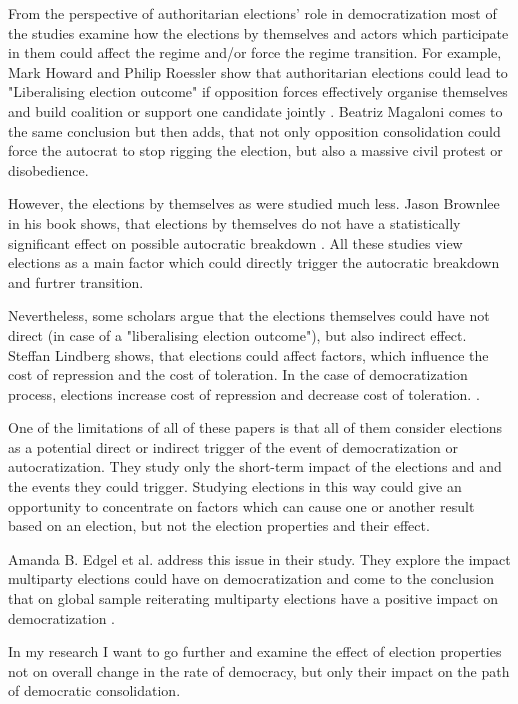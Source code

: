 \documentclass[a4paper, 12pt]{article}
\begin{document}
From the perspective of authoritarian elections' role in democratization most of the studies examine how the elections by themselves and actors which participate in them could affect the regime and/or force the regime transition. For example, Mark Howard and Philip Roessler show that authoritarian elections could lead to "Liberalising election outcome" if opposition forces effectively organise themselves and build coalition or support one candidate jointly \parencite{howard_liberalizing_2006}. Beatriz Magaloni comes to the same conclusion but then adds, that not only opposition consolidation could force the autocrat to stop rigging the election, but also a massive civil protest or disobedience. \par However, the elections by themselves as were studied much less. Jason Brownlee in his book shows, that elections by themselves do not have a statistically significant effect on possible autocratic breakdown \parencite{brownlee_authoritarianism_2007}. All these studies view elections as a main factor which could directly trigger the autocratic breakdown and furtrer transition. \par
Nevertheless, some scholars argue that the elections themselves could have not direct (in case of a "liberalising election outcome"), but also indirect effect. Steffan Lindberg shows, that elections could affect factors, which influence the cost of repression and the cost of toleration. In the case of democratization process, elections increase cost of repression and decrease cost of toleration. \parencite{lindberg_democratization_2009}. \par
One of the limitations of all of these papers is that all of them consider elections as a potential direct or indirect trigger of the event of democratization or autocratization. They study only the short-term impact of the elections and and the events they could trigger. Studying elections in this way could give an opportunity to concentrate on factors which can cause one or another result based on an election, but not the election properties and their effect.
\par Amanda B. Edgel et al. address this issue in their study. They explore the impact multiparty elections could have on democratization and come to the conclusion that on global sample reiterating multiparty elections have a positive impact on democratization \parencite{edgell_when_2018}.
\par In my research I want to go further and examine the effect of election properties not on overall change in the rate of democracy, but only their impact on the path of democratic consolidation.
\end{document}
